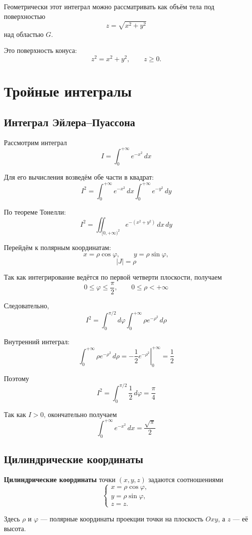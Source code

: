 \documentclass[12pt,a4paper]{article}
\begin{document}
Геометрически этот интеграл можно рассматривать как объём тела под поверхностью
\[
z=\sqrt{x^2+y^2}
\]
над областью $G$.

Это поверхность конуса:
\[
z^2=x^2+y^2,\qquad z\geq0.
\]

\newpage

\section{Тройные интегралы}

\subsection{Интеграл Эйлера--Пуассона}

\begin{example}
Рассмотрим интеграл
\[
I=\int_0^{+\infty}e^{-x^2}\,dx
\]

Для его вычисления возведём обе части в квадрат:
\[
I^2=
\int_0^{+\infty}e^{-x^2}\,dx
\int_0^{+\infty}e^{-y^2}\,dy
\]

По теореме Тонелли:
\[
I^2=
\iint_{[0,+\infty)^2}
e^{-(x^2+y^2)}\,dx\,dy
\]

Перейдём к полярным координатам:
\[
x=\rho\cos\varphi,\qquad
y=\rho\sin\varphi,
\]
\[
|J|=\rho
\]

Так как интегрирование ведётся по первой четверти плоскости, получаем
\[
0\leq\varphi\leq\frac{\pi}{2},
\qquad
0\leq\rho<+\infty
\]

Следовательно,
\[
I^2=
\int_0^{\pi/2}d\varphi
\int_0^{+\infty}\rho e^{-\rho^2}\,d\rho
\]

Внутренний интеграл:
\[
\int_0^{+\infty}\rho e^{-\rho^2}\,d\rho
=
\left.-\frac12e^{-\rho^2}\right|_0^{+\infty}
=\frac12
\]

Поэтому
\[
I^2=
\int_0^{\pi/2}\frac12\,d\varphi
=\frac{\pi}{4}
\]

Так как $I>0$, окончательно получаем
\[
\int_0^{+\infty}e^{-x^2}\,dx
=\frac{\sqrt{\pi}}{2}
\]
\end{example}

\subsection{Цилиндрические координаты}

\begin{definition}
\textbf{Цилиндрические координаты} точки $(x,y,z)$ задаются соотношениями
\[
\begin{cases}
x=\rho\cos\varphi,\\
y=\rho\sin\varphi,\\
z=z.
\end{cases}
\]

Здесь $\rho$ и $\varphi$ — полярные координаты проекции точки на плоскость $Oxy$, а $z$ — её высота.
\end{definition}
\end{document}
